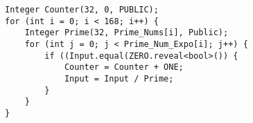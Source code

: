 \begin{verbatim}
Integer Counter(32, 0, PUBLIC);
for (int i = 0; i < 168; i++) {
    Integer Prime(32, Prime_Nums[i], Public);
    for (int j = 0; j < Prime_Num_Expo[i]; j++) {
        if ((Input.equal(ZERO.reveal<bool>()) {
            Counter = Counter + ONE;
            Input = Input / Prime;
        }
    }
}
\end{verbatim}
